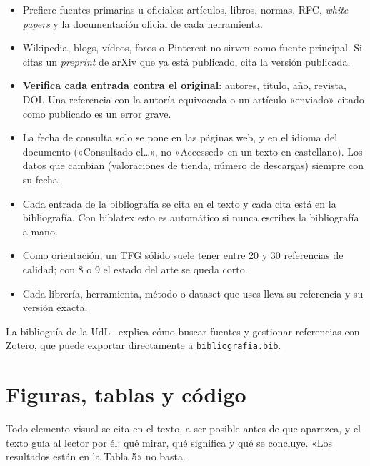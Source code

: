 \documentclass[11pt,a4paper]{article}
\begin{document}
\begin{itemize}
  \item Prefiere fuentes primarias u oficiales: artículos, libros, normas, RFC,
        \emph{white papers} y la documentación oficial de cada herramienta.
  \item Wikipedia, blogs, vídeos, foros o Pinterest no sirven como fuente
        principal. Si citas un \emph{preprint} de arXiv que ya está publicado,
        cita la versión publicada.
  \item \textbf{Verifica cada entrada contra el original}: autores, título,
        año, revista, DOI. Una referencia con la autoría equivocada o un
        artículo «enviado» citado como publicado es un error grave.
  \item La fecha de consulta solo se pone en las páginas web, y en el idioma
        del documento («Consultado el\ldots», no «Accessed» en un texto en
        castellano). Los datos que cambian (valoraciones de tienda, número de
        descargas) siempre con su fecha.
  \item Cada entrada de la bibliografía se cita en el texto y cada cita está en
        la bibliografía. Con biblatex esto es automático si nunca escribes la
        bibliografía a mano.
  \item Como orientación, un TFG sólido suele tener entre 20 y 30 referencias de
        calidad; con 8 o 9 el estado del arte se queda corto.
  \item Cada librería, herramienta, método o dataset que uses lleva su
        referencia y su versión exacta.
\end{itemize}

La biblioguía de la UdL~\cite{udl_biblioguia} explica cómo buscar fuentes y
gestionar referencias con Zotero, que puede exportar directamente a
\texttt{bibliografia.bib}.

\section{Figuras, tablas y código}
\label{sec:figuras}

\begin{regla}
Todo elemento visual se cita en el texto, a ser posible antes de que aparezca, y
el texto guía al lector por él: qué mirar, qué significa y qué se concluye. «Los
resultados están en la Tabla 5» no basta.
\end{regla}
\end{document}
